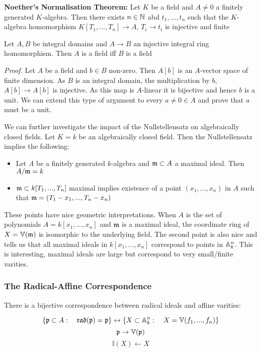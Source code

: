 \begin{theorem}
    \textbf{Noether's Normalisation Theorem: }Let $K$ be a field and $A\neq 0$ a finitely generated $K$-algebra. Then there exists $n \in \mathbb{N}$ abd $t_1,...,t_n$ such that the $K$-algebra homomorphism $K[T_1,...,T_n] \to A$, $T_i \to t_i$ is injective and finite
\end{theorem}

\begin{lemma}
    Let $A,B$ be integral domains and $A\to B$ an injective integral ring homomorphism. Then $A$ is a field iff $B$ is a field
\end{lemma}

\textit{Proof. }Let $A$ be a field and $b \in B$ non-zero. Then $A[b]$ is an $A$-vector space of finite dimension. As $B$ is an integral domain, the multiplication by $b$, $A[b] \to A[b]$ is injective. As this map is $A$-linear it is bijective and hence $b$ is a unit. We can extend this type of argument to every $a\neq 0 \in A$ and prove that $a$ must be a unit. 

We can further investigate the impact of the Nullstellensatz on algebraically closed fields. Let $K = k$ be an algebraically closed field. Then the Nullstellensatz implies the following:
\begin{itemize}
    \item Let $A$ be a finitely generated $k$-algebra and $\mathfrak{m} \subset A$ a maximal ideal. Then $A/\mathfrak{m} = k$
    \item $\mathfrak{m} \subset k[T_1,...,T_n]$ maximal implies existence of a point $(x_1,...,x_n)$ in $A$ such that $\mathfrak{m} = (T_1 - x_1,...,T_n - x_n)$
\end{itemize}
These points have nice geometric interpretations. When $A$ is the set of polynomials $A = k[x_1,...,x_n]$ and $\mathfrak{m}$ is a maximal ideal, the coordinate ring of $X = \mathbb{V}(\mathfrak{m})$ is isomorphic to the underlying field. The second point is also nice and tells us that all maximal ideals in $k[x_1,...,x_n]$ correspond to points in $\mathbb{A}_k^n$. This is interesting, maximal ideals are large but correspond to very small/finite varities. 

\subsubsection{The Radical-Affine Correspondence}

There is a bijective correspondence between radical ideals and affine varities:

\[\{\mathfrak{p} \subset A:\quad \mathfrak{rad}(\mathfrak{p}) = \mathfrak{p}\} \leftrightarrow \{X \subset \mathbb{A}^n_k: \quad X = \mathbb{V}(f_1,...,f_n)\}\]
\[\mathfrak{p} \to \mathbb{V}(\mathfrak{p})\]
\[\mathbb{I}(X) \leftarrow X\]

